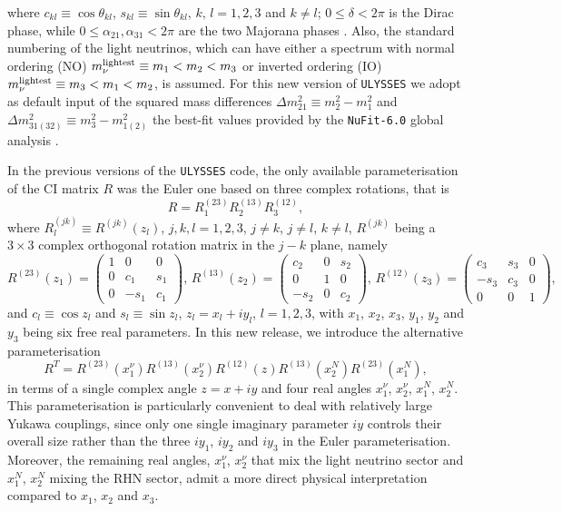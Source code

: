 \documentclass[12pt, a4paper]{article}
\newcommand{\mnulight}{m_{\nu}^{\rm lightest}}
\begin{document}
where $c_{kl} \equiv \cos\theta_{kl}$, $s_{kl} \equiv \sin\theta_{kl}$, $k,\,l = 1,2,3$ and $k\neq l$;
$0\leq \delta < 2\pi$ is the Dirac phase,
while $0 \leq \alpha_{21}, \alpha_{31} < 2\pi$ are the two Majorana phases \cite{Bilenky:1980cx}. Also, the standard numbering of the light neutrinos, which can have either a spectrum with normal ordering (NO) $\mnulight \equiv m_1 < m_2 < m_3$ or inverted ordering (IO) $\mnulight \equiv m_3<m_1<m_2$, is assumed. For this new version of \texttt{ULYSSES} we adopt as default input of the squared mass differences $\Delta m_{21}^2 \equiv m_2^2-m_1^2$ and $\Delta m_{31(32)}^2 \equiv m_3^2-m_{1(2)}^2$ the best-fit values provided by the \texttt{NuFit-6.0} 
global analysis \cite{%
Esteban:2024eli}.

In the previous versions of the \texttt{ULYSSES} code, the only available parameterisation of the CI matrix $R$ was the Euler one based on three complex rotations, that is
\begin{equation}\label{eq:Euler_O}
R = R^{(23)}_1R^{(13)}_2R^{(12)}_3,
\end{equation}
where $R^{(jk)}_l\equiv R^{(jk)}(z_l)$, $j,k,l = 1,2,3$, $j\neq k$, $j\neq l$, $k\neq l$, $R^{(jk)}$ being a $3\times 3$ complex orthogonal rotation matrix in the $j-k$ plane, namely
\begin{equation}\label{eq:complex_rotations}
R^{(23)}(z_1)=\begin{pmatrix}
 1&0&0\\
 0&c_1&s_1\\
 0&-s_1&c_1
 \end{pmatrix},\,
R^{(13)}(z_2)= \begin{pmatrix}
 c_2&0&s_2\\
 0&1&0\\
 -s_2&0&c_2
 \end{pmatrix},\,
 R^{(12)}(z_3)=\begin{pmatrix}
 c_3&s_3&0\\
 -s_3&c_3&0\\
 0&0&1
 \end{pmatrix},
 \end{equation}
 and $c_l \equiv \cos z_l$ and $s_l \equiv \sin z_l$, $z_l = x_l+i y_l$, $l=1,2,3$, with $x_1$, $x_2$, $x_3$, $y_1$, $y_2$ and $y_3$ being six free real parameters.
 In this new release, we introduce the alternative parameterisation \cite{Drewes:2021nqr}
\begin{equation}
\label{eq:alt_O}
R^T = R^{(23)}(x_1^\nu)R^{(13)}(x_2^\nu)R^{(12)}(z)R^{(13)}(x_2^N)R^{(23)}(x_1^N) ,
\end{equation}
%
in terms of a single complex angle $z = x + i y$ and four real angles $x_1^\nu$, $x_2^\nu$, $x_1^N$, $x_2^N$. This parameterisation is particularly convenient to deal with relatively large Yukawa couplings, since only one single imaginary parameter $iy$ controls their overall size rather than the three $iy_1$, $iy_2$ and $iy_3$ in the Euler parameterisation. Moreover, the remaining real angles, $x^\nu_1$, $x_2^\nu$ that mix the light neutrino sector and $x^N_1$, $x_2^N$ mixing the RHN sector, admit a more direct physical interpretation compared to $x_1$, $x_2$ and $x_3$.
\end{document}
